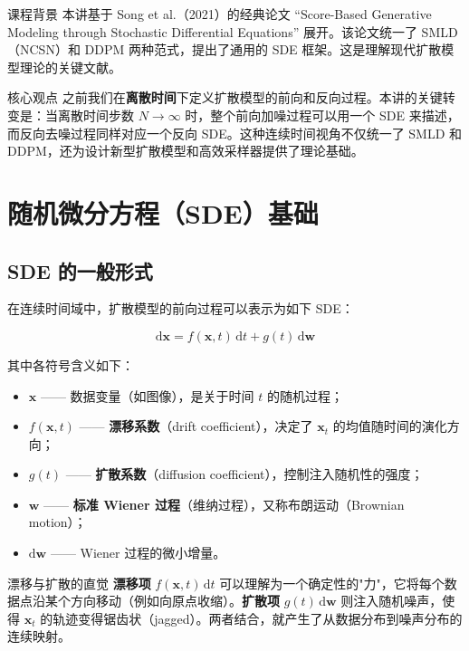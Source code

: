 \documentclass[a4paper]{article}
\begin{document}
\begin{knowledgebox}{课程背景}
本讲基于 Song et al.（2021）的经典论文 ``Score-Based Generative Modeling through Stochastic Differential Equations'' 展开。该论文统一了 SMLD（NCSN）和 DDPM 两种范式，提出了通用的 SDE 框架。这是理解现代扩散模型理论的关键文献。
\end{knowledgebox}

\begin{importantbox}{核心观点}
之前我们在\textbf{离散时间}下定义扩散模型的前向和反向过程。本讲的关键转变是：当离散时间步数 $N \to \infty$ 时，整个前向加噪过程可以用一个 SDE 来描述，而反向去噪过程同样对应一个反向 SDE。这种连续时间视角不仅统一了 SMLD 和 DDPM，还为设计新型扩散模型和高效采样器提供了理论基础。
\end{importantbox}


\section{随机微分方程（SDE）基础}

\subsection{SDE 的一般形式}

在连续时间域中，扩散模型的前向过程可以表示为如下 SDE：

$$
\mathrm{d}\mathbf{x} = f(\mathbf{x}, t)\,\mathrm{d}t + g(t)\,\mathrm{d}\mathbf{w}
$$

其中各符号含义如下：

\begin{itemize}
    \item $\mathbf{x}$ —— 数据变量（如图像），是关于时间 $t$ 的随机过程；
    \item $f(\mathbf{x}, t)$ —— \textbf{漂移系数}（drift coefficient），决定了 $\mathbf{x}_t$ 的均值随时间的演化方向；
    \item $g(t)$ —— \textbf{扩散系数}（diffusion coefficient），控制注入随机性的强度；
    \item $\mathbf{w}$ —— \textbf{标准 Wiener 过程}（维纳过程），又称布朗运动（Brownian motion）；
    \item $\mathrm{d}\mathbf{w}$ —— Wiener 过程的微小增量。
\end{itemize}

\begin{importantbox}{漂移与扩散的直觉}
\textbf{漂移项} $f(\mathbf{x}, t)\,\mathrm{d}t$ 可以理解为一个确定性的"力"，它将每个数据点沿某个方向移动（例如向原点收缩）。\textbf{扩散项} $g(t)\,\mathrm{d}\mathbf{w}$ 则注入随机噪声，使得 $\mathbf{x}_t$ 的轨迹变得锯齿状（jagged）。两者结合，就产生了从数据分布到噪声分布的连续映射。
\end{importantbox}
\end{document}
